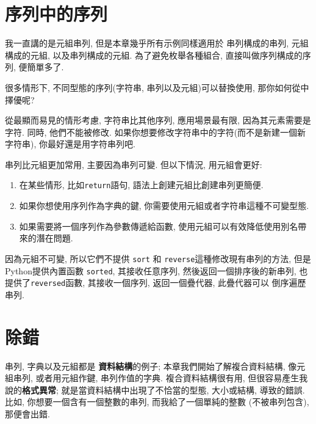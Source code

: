 \documentclass[10pt]{book}
\begin{document}
\section{序列中的序列}

我一直講的是元組串列, 但是本章幾乎所有示例同樣適用於
串列構成的串列, 元組構成的元組, 以及串列構成的元組. 
為了避免枚舉各種組合, 直接叫做序列構成的序列, 便簡單多了. 

很多情形下, 不同型態的序列(字符串, 串列以及元組)可以替換使用, 
那你如何從中擇優呢?

從最顯而易見的情形考慮, 字符串比其他序列, 應用場景最有限, 
因為其元素需要是字符. 
同時, 他們不能被修改. 
如果你想要修改字符串中的字符(而不是新建一個新字符串), 
你最好還是用字符串列吧. 

串列比元組更加常用, 主要因為串列可變. 
但以下情況, 用元組會更好:

\begin{enumerate}

\item 在某些情形, 比如{\tt return}語句, 語法上創建元組比創建串列更簡便. 

\item 如果你想使用序列作為字典的鍵, 
你需要使用元組或者字符串這種不可變型態. 

\item 如果需要將一個序列作為參數傳遞給函數, 
使用元組可以有效降低使用別名帶來的潛在問題. 

\end{enumerate}

因為元組不可變, 所以它們不提供 {\tt sort} 和 {\tt reverse}這種修改現有串列的方法, 
但是Python提供內置函數 {\tt sorted}, 其接收任意序列, 然後返回一個排序後的新串列, 
也提供了{\tt reversed}函數, 其接收一個序列, 返回一個疊代器, 此疊代器可以
倒序遍歷串列. 
 


\section{除錯}

串列, 字典以及元組都是 {\bf 資料結構}的例子;
本章我們開始了解複合資料結構, 像元組串列, 或者用元組作鍵, 
串列作值的字典. 
複合資料結構很有用, 但很容易產生我說的{\bf 格式異常};
就是當資料結構中出現了不恰當的型態, 大小或結構, 導致的錯誤. 
比如, 你想要一個含有一個整數的串列, 而我給了一個單純的整數
(不被串列包含), 那便會出錯. 
\end{document}
